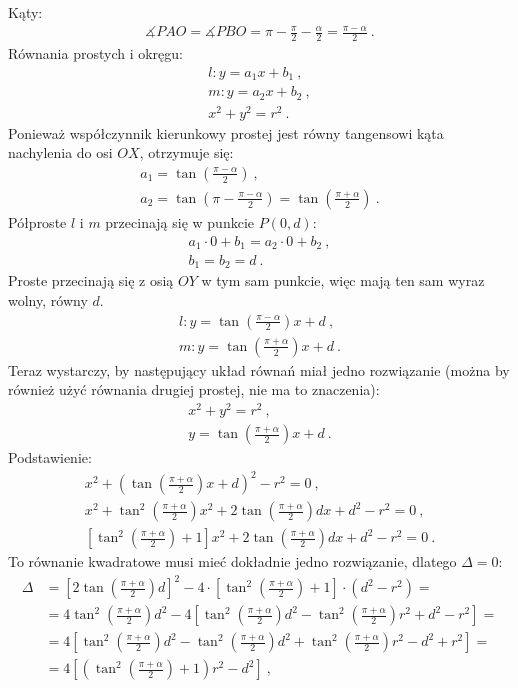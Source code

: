 \noindent Kąty:
\begin{gather*}
\measuredangle PAO = \measuredangle PBO = \pi - \frac{\pi}{2} - \frac{\alpha}{2} = \frac{\pi - \alpha}{2}\ . 
\end{gather*}
Równania prostych i okręgu:
\begin{gather*}
l: y = a_1x + b_1\ ,\\
m: y = a_2x + b_2\ ,\\
x^2 + y^2 = r^2\ .
\end{gather*}
Ponieważ współczynnik kierunkowy prostej jest równy tangensowi kąta nachylenia do osi $OX$, otrzymuje się:
\begin{gather*}
a_1 = \tan (\frac{\pi - \alpha}{2})\ , \\ 
a_2 = \tan (\pi - \frac{\pi - \alpha}{2}) = \tan (\frac{\pi + \alpha}{2})\ .
\end{gather*}
Półproste $l$ i $m$ przecinają się w punkcie $P(0, d)$:
\begin{gather*}
a_1 \cdot 0 + b_1 = a_2 \cdot 0 + b_2\ , \\
b_1 = b_2 = d\ .
\end{gather*}
Proste przecinają się z osią $OY$ w tym sam punkcie, więc mają ten sam wyraz wolny, równy $d$.
\begin{gather*}
l: y = \tan (\frac{\pi - \alpha}{2})x + d\ , \\
m: y = \tan (\frac{\pi + \alpha}{2})x + d\ .
\end{gather*}
Teraz wystarczy, by następujący układ równań miał jedno rozwiązanie (można by również użyć równania drugiej prostej, nie ma to znaczenia):
\begin{gather*}
x^2 + y^2 = r^2\ , \\ 
y = \tan (\frac{\pi + \alpha}{2})x + d\ .
\end{gather*}
Podstawienie:
\begin{gather*}
x^2 + (\tan(\frac{\pi + \alpha}{2})x + d)^2 - r^2 = 0\ , \\
x^2 + \tan^2(\frac{\pi + \alpha}{2})x^2 + 2\tan(\frac{\pi + \alpha}{2})dx + d^2 - r^2 = 0\ , \\
[\tan^2(\frac{\pi + \alpha}{2}) + 1]x^2 + 2\tan(\frac{\pi + \alpha}{2})dx + d^2 - r^2 = 0\ .
\end{gather*}
To równanie kwadratowe musi mieć dokładnie jedno rozwiązanie, dlatego $\Delta = 0$:
\begin{equation*}
\begin{split}
\Delta & = [2\tan(\frac{\pi + \alpha}{2})d]^2 - 4\cdot[\tan^2(\frac{\pi + \alpha}{2}) + 1]\cdot (d^2 - r^2) = \\
 & = 4\tan^2(\frac{\pi + \alpha}{2})d^2 - 4[\tan^2(\frac{\pi + \alpha}{2})d^2 - \tan^2(\frac{\pi + \alpha}{2})r^2 + d^2 - r^2] = \\
 & = 4[\tan^2(\frac{\pi + \alpha}{2})d^2 - \tan^2(\frac{\pi + \alpha}{2})d^2 + \tan^2(\frac{\pi + \alpha}{2})r^2 - d^2 + r^2] = \\
 & = 4[(\tan^2(\frac{\pi + \alpha}{2}) + 1)r^2 - d^2]\ ,
\end{split}
\end{equation*}
